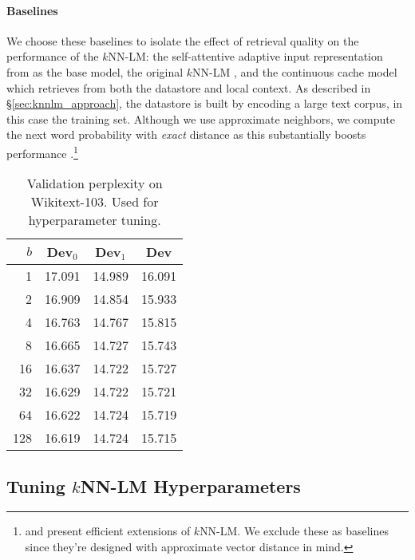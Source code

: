 \documentclass[11pt]{article}
\begin{document}
\paragraph{Baselines} We choose these baselines to isolate the effect of retrieval quality on the performance of the $k$NN-LM: the self-attentive adaptive input representation from \citet{baevski2018adaptive} as the base model, the original $k$NN-LM \cite{khandelwal20generalization}, and the continuous cache model \cite{Grave2017ImprovingNL} which retrieves from both the datastore and local context. As described in \S\ref{sec:knnlm_approach}, the datastore is built by encoding a large text corpus, in this case the training set. Although we use approximate neighbors, we compute the next word probability with \textit{exact} distance as this substantially boosts performance \cite{khandelwal20generalization}.\footnote{\citet{He2021EfficientNN} and \citet{Alon2022NeuroSymbolicLM} present efficient extensions of $k$NN-LM. We exclude these as baselines since they're designed with approximate vector distance in mind.}


\begin{table}[t!]
\setlength\tabcolsep{4pt}
\begin{center}
\begin{tabular}{ r | c | c | c }
\toprule
$b$ & Dev$_{0}$ & Dev$_{1}$ & Dev \\
\midrule
1 & 17.091 & 14.989 & 16.091 \\
2 & 16.909 & 14.854 & 15.933 \\
4 & 16.763 & 14.767 & 15.815 \\
8 & 16.665 & 14.727 & 15.743 \\
16 & 16.637 & 14.722 & 15.727 \\
32 & 16.629 & 14.722 & 15.721 \\
64 & 16.622 & 14.724 & 15.719 \\
128 & 16.619 & 14.724 & 15.715 \\
\bottomrule
\end{tabular}
\end{center}
\caption{Validation perplexity on Wikitext-103. Used for hyperparameter tuning.}
\label{tab:tune}
\end{table}

\subsection{Tuning $k$NN-LM Hyperparameters}
\end{document}
